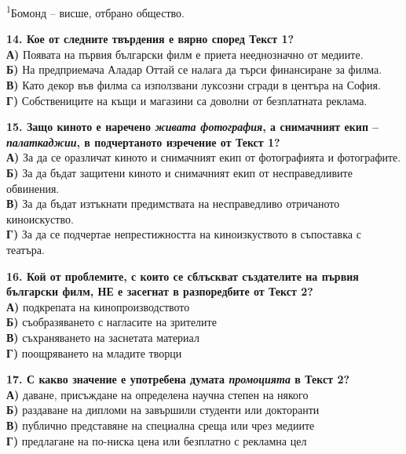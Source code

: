 \documentclass[12pt,a4paper]{article}
\begin{document}
\vspace{0.2cm}
\noindent
{\footnotesize{\textsuperscript{1}Бомонд – висше, отбрано общество.} \hfill}

\vspace{0.6cm}

\noindent
\textbf{14. Кое от следните твърдения е вярно според Текст 1?} \\
\textbf{А)} Появата на първия български филм е приета нееднозначно от медиите. \\
\textbf{Б)} На предприемача Аладар Оттай се налага да търси финансиране за филма. \\
\textbf{В)} Като декор във филма са използвани луксозни сгради в центъра на София. \\
\textbf{Г)} Собствениците на къщи и магазини са доволни от безплатната реклама.

\vspace{0.6cm}

\noindent
\textbf{15. Защо киното е наречено \textit{живата фотография}, а снимачният екип – \textit{палаткаджии}, в подчертаното изречение от Текст 1?} \\
\textbf{А)} За да се оразличат киното и снимачният екип от фотографията и фотографите. \\
\textbf{Б)} За да бъдат защитени киното и снимачният екип от несправедливите обвинения. \\
\textbf{В)} За да бъдат изтъкнати предимствата на несправедливо отричаното киноискуство. \\
\textbf{Г)} За да се подчертае непрестижността на киноизкуството в съпоставка с театъра.

\vspace{0.6cm}

\noindent
\textbf{16. Кой от проблемите, с които се сблъскват създателите на първия български филм, НЕ е засегнат в разпоредбите от Текст 2?} \\
\textbf{А)} подкрепата на кинопроизводството \\
\textbf{Б)} съобразяването с нагласите на зрителите \\
\textbf{В)} съхраняването на заснетата материал \\
\textbf{Г)} поощряването на младите творци

\vspace{0.6cm}

\noindent
\textbf{17. С какво значение е употребена думата \textit{промоцията} в Текст 2?} \\
\textbf{А)} даване, присъждане на определена научна степен на някого \\
\textbf{Б)} раздаване на дипломи на завършили студенти или докторанти \\
\textbf{В)} публично представяне на специална среща или чрез медиите \\
\textbf{Г)} предлагане на по-ниска цена или безплатно с рекламна цел
\end{document}
